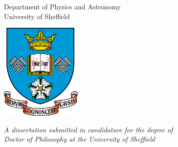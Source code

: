 \thispagestyle{empty}

\begin{center}

\Huge{\textbf{\thetitle}}
\vspace*{2.5cm}

\LARGE{\theauthor}
\vspace{2cm}

\Large{Department of Physics and Astronomy \\ University of Sheffield}
\vspace*{2cm}

\includegraphics[width=0.3\textwidth]{./images/University_of_Sheffield_coat_of_arms.png}
\vspace*{1cm}

\large{\textit{A dissertation submitted in candidature for the degree of \\
                Doctor of Philosophy at the University of Sheffield}}
\vspace*{1.5cm}

\text{\thedate}
\vfill

\end{center}
